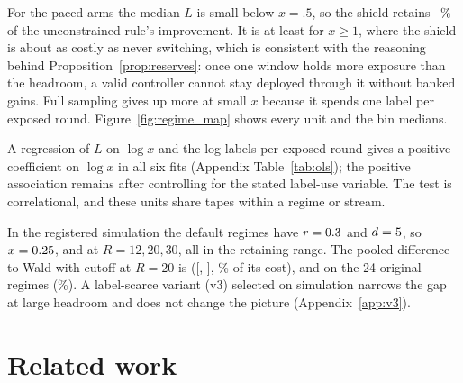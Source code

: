 \documentclass[10pt]{article}
\theoremstyle{plain}
\theoremstyle{definition}
\begin{document}
For the paced arms the median $L$ is small below $x=.5$, so the shield retains \KeepLo--\KeepHi\% of the unconstrained rule's improvement. It is at least \LargeXMin{} for $x\ge1$, where the shield is about as costly as never switching, which is consistent with the reasoning behind Proposition~\ref{prop:reserves}: once one window holds more exposure than the headroom, a valid controller cannot stay deployed through it without banked gains. Full sampling gives up more at small $x$ because it spends one label per exposed round. Figure~\ref{fig:regime_map} shows every unit and the bin medians.


A regression of $L$ on $\log x$ and the log labels per exposed round gives a positive coefficient on $\log x$ in all six fits (Appendix Table~\ref{tab:ols}); the positive association remains after controlling for the stated label-use variable. The test is correlational, and these units share tapes within a regime or stream.

In the registered simulation the default regimes have $r=0.3$ and $d=5$, so $x=0.25$, \DefXTwenty{} and \DefXThirty{} at $R=12,20,30$, all in the retaining range. The pooled difference to Wald with cutoff at $R=20$ is \SimVsWaldDelta{} ([\SimVsWaldLo, \SimVsWaldHi], \SimVsWaldPct\% of its cost), and \OrigDelta{} on the 24 original regimes (\OrigPct\%). A label-scarce variant (v3) selected on simulation narrows the gap at large headroom and does not change the picture (Appendix~\ref{app:v3}).

\begin{table}[t]
\caption{Regime map: Spearman correlation of $x=rd/h$ with $L$, the share of the unconstrained rule's improvement given up, and median $L$ by bin of $x$. Source: \texttt{exposure\_ratio\_test.json}.}\label{tab:regime}
\centering\scriptsize
\resizebox{\linewidth}{!}{}
\end{table}

\section{Related work}
\end{document}
